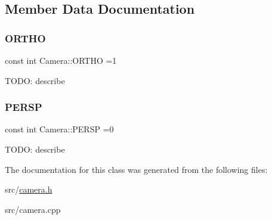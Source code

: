 \subsection{Member Data Documentation}
\mbox{\label{class_camera_a7244b2a4baebe084d16492758d16451c}} 
\subsubsection{\texorpdfstring{O\+R\+T\+HO}{ORTHO}}
{\footnotesize\ttfamily const int Camera\+::\+O\+R\+T\+HO =1\hspace{0.3cm}{\ttfamily [static]}}

T\+O\+DO\+: describe \mbox{\label{class_camera_a522ee90309c2918e4b9695fcdccd061c}} 
\subsubsection{\texorpdfstring{P\+E\+R\+SP}{PERSP}}
{\footnotesize\ttfamily const int Camera\+::\+P\+E\+R\+SP =0\hspace{0.3cm}{\ttfamily [static]}}

T\+O\+DO\+: describe 

The documentation for this class was generated from the following files\+:\begin{DoxyCompactItemize}
\item 
src/\mbox{\hyperlink{camera_8h}{camera.\+h}}\item 
src/camera.\+cpp\end{DoxyCompactItemize}
